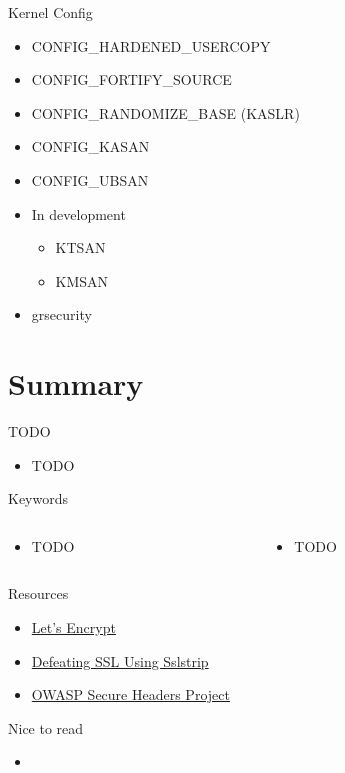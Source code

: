 \documentclass{curs}
\begin{document}
\begin{frame}{Kernel Config}
  \begin{itemize}
    \item CONFIG_HARDENED_USERCOPY
    \item CONFIG_FORTIFY_SOURCE
    \item CONFIG_RANDOMIZE_BASE (KASLR)
    \item CONFIG_KASAN
    \item CONFIG_UBSAN
    \item In development
      \begin{itemize}
        \item KTSAN
        \item KMSAN
      \end{itemize}
    \item grsecurity
  \end{itemize}
\end{frame}


\section{Summary}

\begin{frame}{TODO}
  \begin{itemize}
    \item TODO
  \end{itemize}
\end{frame}

\begin{frame}{Keywords}
  \begin{columns}
    \begin{column}{0.5\textwidth}
      \begin{itemize}
        \item TODO
      \end{itemize}
    \end{column}
    \begin{column}{0.5\textwidth}
      \begin{itemize}
        \item TODO
      \end{itemize}
    \end{column}
  \end{columns}
\end{frame}

\begin{frame}{Resources}
  \begin{itemize}
    \item \href{https://letsencrypt.org/}{Let's Encrypt}
    \item \href{https://www.youtube.com/watch?v=MFol6IMbZ7Y}{Defeating SSL Using Sslstrip}
    \item \href{https://www.owasp.org/index.php/OWASP_Secure_Headers_Project}{OWASP Secure Headers Project}
  \end{itemize}
\end{frame}

\begin{frame}{Nice to read}
  \begin{itemize}
    \item 
  \end{itemize}
\end{frame}
\end{document}

